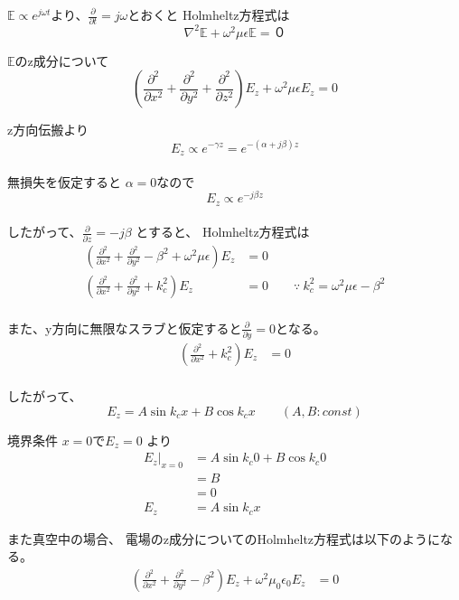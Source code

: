 \documentclass[a4paper,10pt]{bxjsarticle}
\begin{document}
$\mathbb{E} \propto e^{j\omega t}$より、$\frac{\partial}{\partial t} = j\omega$とおくと
Holmheltz方程式は
$$
\nabla^2 \mathbb{E} + \omega^2 \mu \epsilon \mathbb{E} = ０
$$

$\mathbb{E}$のz成分について
$$
\left( 
    \frac{\partial^2}{\partial x^2} 
    + \frac{\partial^2}{\partial y^2} 
    + \frac{\partial^2}{\partial z^2} 
\right) E_z
+ \omega^2 \mu \epsilon E_z
= 0
$$

z方向伝搬より $$E_z \propto e^{-\gamma z} = e^{-(\alpha + j \beta)z}$$ \\
無損失を仮定すると $\alpha = 0$なので $$E_z \propto e^{ -j \beta z}$$ \\
したがって、$ \frac{\partial}{\partial z} = -j \beta $ とすると、
Holmheltz方程式は
\begin{align*} 
\left( 
    \frac{\partial^2}{\partial x^2} 
    + \frac{\partial^2}{\partial y^2} 
    - \beta^2 
    + \omega^2 \mu \epsilon
\right) E_z
&= 0 \\
\left( 
    \frac{\partial^2}{\partial x^2} 
    + \frac{\partial^2}{\partial y^2} 
    + k_c^2
\right) E_z
&= 0 \qquad
\because \ k_c^2 = \omega^2 \mu \epsilon - \beta^2 \\
\end{align*}

また、y方向に無限なスラブと仮定すると$\frac{\partial}{\partial y} = 0$となる。
\begin{align*} 
    \left( 
        \frac{\partial^2}{\partial x^2} + k_c^2
    \right) E_z
    &= 0 \\
\end{align*}

したがって、
$$ E_z = A \sin k_c x + B \cos k_c x \qquad (A,B : const) $$

境界条件 $x = 0$で$E_z = 0$ より
\begin{align*}
    E_z|_{x=0} &= A \sin k_c 0 + B \cos k_c 0 \\
             &= B \\ 
             &= 0 \\
    E_z &= A \sin k_c x
\end{align*}

また真空中の場合、
電場のz成分についてのHolmheltz方程式は以下のようになる。
\begin{align*}
    \left( 
        \frac{\partial^2}{\partial x^2} 
        + \frac{\partial^2}{\partial y^2} 
        - \beta^2
    \right) E_z
    + \omega^2 \mu_0 \epsilon_0 E_z
    & = 0
\end{align*}
\end{document}
